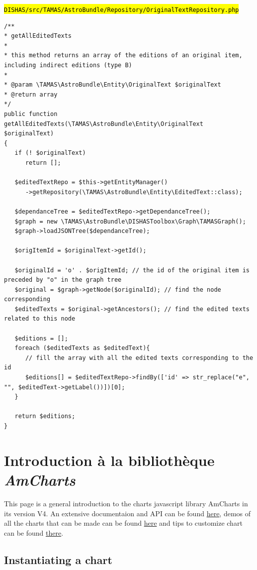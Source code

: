 \documentclass[a4paper,12pt,twoside]{book}
\newcommand{\clearemptydoublepage}{\newpage{\pagestyle{empty}\cleardoublepage}}
\let\OldTexttt\texttt
\renewcommand{\texttt}[1]{\OldTexttt{\hl{#1}}}
\newcommand{\eng}{\emph}
\begin{document}
\texttt{DISHAS/src/TAMAS/AstroBundle/Repository/OriginalTextRepository.php}

\begin{lstlisting}
/**
* getAllEditedTexts
*
* this method returns an array of the editions of an original item, including indirect editions (type B)
* 
* @param \TAMAS\AstroBundle\Entity\OriginalText $originalText
* @return array
*/
public function getAllEditedTexts(\TAMAS\AstroBundle\Entity\OriginalText $originalText)
{
   if (! $originalText)
      return [];

   $editedTextRepo = $this->getEntityManager()
      ->getRepository(\TAMAS\AstroBundle\Entity\EditedText::class);

   $dependanceTree = $editedTextRepo->getDependanceTree();
   $graph = new \TAMAS\AstroBundle\DISHASToolbox\Graph\TAMASGraph();
   $graph->loadJSONTree($dependanceTree);

   $origItemId = $originalText->getId();

   $originalId = 'o' . $origItemId; // the id of the original item is preceded by "o" in the graph tree
   $original = $graph->getNode($originalId); // find the node corresponding
   $editedTexts = $original->getAncestors(); // find the edited texts related to this node

   $editions = [];
   foreach ($editedTexts as $editedText){
      // fill the array with all the edited texts corresponding to the id
      $editions[] = $editedTextRepo->findBy(['id' => str_replace("e", "", $editedText->getLabel())])[0];
   }

   return $editions;
}
\end{lstlisting}

\clearemptydoublepage

\chapter{\label{AmCharts}Introduction à la bibliothèque \eng{AmCharts}}

This page is a general introduction to the charts javascript library AmCharts in its version V4. An extensive documentaion and API can be found \href{https://www.amcharts.com/docs/v4/}{here}, demos of all the charts that can be made can be found \href{https://www.amcharts.com/demos/}{here} and tips to customize chart can be found \href{https://www.amcharts.com/t/tips/}{there}.

		\section{Instantiating a chart}\label{instantiating-a-chart}
\end{document}
